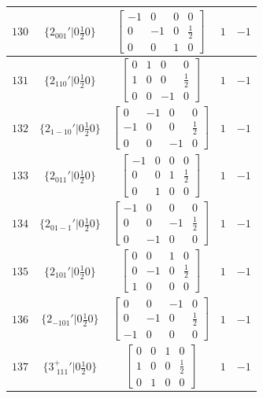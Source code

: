 \documentclass[fleqn,8pt]{jsarticle}
\begin{document}
\begin{longtable}{ccccc}
$ 130 $ & $ \{2{}_{001}{}'|0 \frac{1}{2} 0\} $ & $ \begin{bmatrix} -1 & 0 & 0 & 0 \\ 0 & -1 & 0 & \frac{1}{2} \\ 0 & 0 & 1 & 0 \end{bmatrix} $ & $ 1 $ & $ -1 $ \\ \hline
$ 131 $ & $ \{2{}_{110}{}'|0 \frac{1}{2} 0\} $ & $ \begin{bmatrix} 0 & 1 & 0 & 0 \\ 1 & 0 & 0 & \frac{1}{2} \\ 0 & 0 & -1 & 0 \end{bmatrix} $ & $ 1 $ & $ -1 $ \\ \hline
$ 132 $ & $ \{2{}_{1-10}{}'|0 \frac{1}{2} 0\} $ & $ \begin{bmatrix} 0 & -1 & 0 & 0 \\ -1 & 0 & 0 & \frac{1}{2} \\ 0 & 0 & -1 & 0 \end{bmatrix} $ & $ 1 $ & $ -1 $ \\ \hline
$ 133 $ & $ \{2{}_{011}{}'|0 \frac{1}{2} 0\} $ & $ \begin{bmatrix} -1 & 0 & 0 & 0 \\ 0 & 0 & 1 & \frac{1}{2} \\ 0 & 1 & 0 & 0 \end{bmatrix} $ & $ 1 $ & $ -1 $ \\ \hline
$ 134 $ & $ \{2{}_{01-1}{}'|0 \frac{1}{2} 0\} $ & $ \begin{bmatrix} -1 & 0 & 0 & 0 \\ 0 & 0 & -1 & \frac{1}{2} \\ 0 & -1 & 0 & 0 \end{bmatrix} $ & $ 1 $ & $ -1 $ \\ \hline
$ 135 $ & $ \{2{}_{101}{}'|0 \frac{1}{2} 0\} $ & $ \begin{bmatrix} 0 & 0 & 1 & 0 \\ 0 & -1 & 0 & \frac{1}{2} \\ 1 & 0 & 0 & 0 \end{bmatrix} $ & $ 1 $ & $ -1 $ \\ \hline
$ 136 $ & $ \{2{}_{-101}{}'|0 \frac{1}{2} 0\} $ & $ \begin{bmatrix} 0 & 0 & -1 & 0 \\ 0 & -1 & 0 & \frac{1}{2} \\ -1 & 0 & 0 & 0 \end{bmatrix} $ & $ 1 $ & $ -1 $ \\ \hline
$ 137 $ & $ \{3^{+}_{\,\,111}{}'|0 \frac{1}{2} 0\} $ & $ \begin{bmatrix} 0 & 0 & 1 & 0 \\ 1 & 0 & 0 & \frac{1}{2} \\ 0 & 1 & 0 & 0 \end{bmatrix} $ & $ 1 $ & $ -1 $ \\ \hline

\end{longtable}
\end{document}

